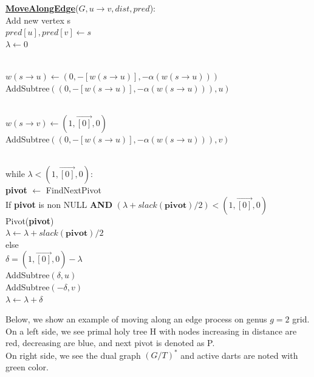 \documentclass{article}
\begin{document}
\begin{center}
\begin{algorithm}
\textbf{\underline{MoveAlongEdge}}($G, u \rightarrow v, dist, pred$): \\ \quad
Add new vertex s \\ \quad
$pred[u], pred[v] \leftarrow s$ \\ \quad
$\lambda \leftarrow 0$ \\ \\ \quad

$w(s \rightarrow u) \leftarrow ( 0, -[w(s \rightarrow u)], 
-\alpha(w(s \rightarrow u)) )$ \\ \quad
AddSubtree$(( 0, -[w(s \rightarrow u)], 
-\alpha(w(s \rightarrow u)) ), u)$ \\ \\ \quad

$w(s \rightarrow v) \leftarrow ( 1, \vec{[0]}, 0 )$ \\ \quad
AddSubtree$(( 0, -[w(s \rightarrow u)], 
-\alpha(w(s \rightarrow u)) ), v)$ \\ \\ \quad

while $\lambda < ( 1, \vec{[0]}, 0 )$: \\ \quad \quad
    \textbf{pivot} $\leftarrow $ FindNextPivot \\ \quad \quad
    If \textbf{pivot} is non NULL \textbf{AND} 
    $(\lambda + slack(\textbf{pivot}) / 2) < ( 1, \vec{[0]}, 0 )$ \\ \qquad \quad
        Pivot(\textbf{pivot}) \\ \qquad \quad
        $\lambda \leftarrow \lambda + slack(\textbf{pivot}) / 2$ \\ \quad \quad
    else \\ \qquad \quad
        $\delta = ( 1, \vec{[0]}, 0 ) - \lambda$ \\ \qquad \quad
        AddSubtree$(\delta, u)$ \\ \qquad \quad
        AddSubtree$(-\delta, v)$ \\ \qquad \quad
        $\lambda \leftarrow \lambda + \delta$ \\
\end{algorithm}
\end{center}

Below, we show an example of moving along an edge process on genus $g=2$ grid.\\
On a left side, we see primal holy tree H with nodes increasing in distance are 
red, decreasing are blue, and next pivot is denoted as P.\\
On right side, we see the dual graph $(G/T)^*$ and active darts are noted 
with green color.
\end{document}
